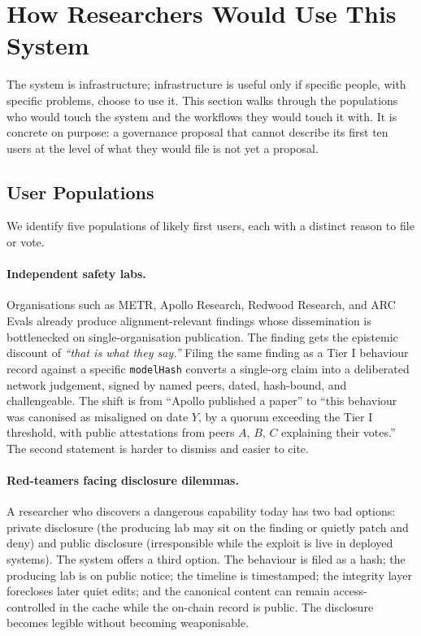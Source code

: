 \documentclass[11pt,a4paper]{article}
\begin{document}
\section{How Researchers Would Use This System}

The system is infrastructure; infrastructure is useful only if
specific people, with specific problems, choose to use it. This
section walks through the populations who would touch the system
and the workflows they would touch it with. It is concrete on
purpose: a governance proposal that cannot describe its first
ten users at the level of what they would file is not yet a
proposal.

\subsection{User Populations}

We identify five populations of likely first users, each with a
distinct reason to file or vote.

\paragraph{Independent safety labs.} Organisations such as METR,
Apollo Research, Redwood Research, and ARC Evals already produce
alignment-relevant findings whose dissemination is bottlenecked
on single-organisation publication. The finding gets the
epistemic discount of \emph{``that is what they say.''} Filing
the same finding as a Tier I behaviour record against a specific
\texttt{modelHash} converts a single-org claim into a deliberated
network judgement, signed by named peers, dated, hash-bound, and
challengeable. The shift is from ``Apollo published a paper'' to
``this behaviour was canonised as misaligned on date $Y$, by a
quorum exceeding the Tier I threshold, with public attestations
from peers $A$, $B$, $C$ explaining their votes.'' The second
statement is harder to dismiss and easier to cite.

\paragraph{Red-teamers facing disclosure dilemmas.} A researcher
who discovers a dangerous capability today has two bad options:
private disclosure (the producing lab may sit on the finding or
quietly patch and deny) and public disclosure (irresponsible
while the exploit is live in deployed systems). The system
offers a third option. The behaviour is filed as a hash; the
producing lab is on public notice; the timeline is timestamped;
the integrity layer forecloses later quiet edits; and the
canonical content can remain access-controlled in the cache
while the on-chain record is public. The disclosure becomes
legible without becoming weaponisable.
\end{document}
